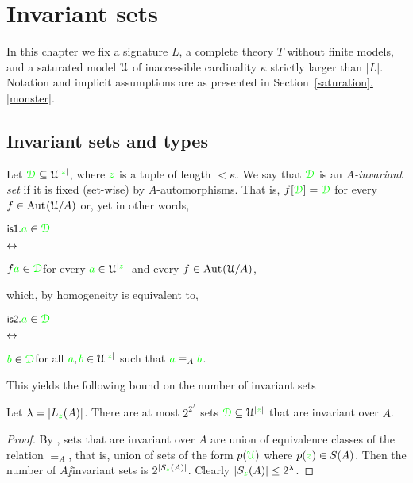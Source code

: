 \documentclass[creche.tex]{subfiles}
\begin{document}
\chapter{Invariant sets}
\label{invariant}


\def\medrel#1{\parbox[t]{6ex}{$\displaystyle\hfil #1$}}
\def\ceq#1#2#3{\parbox[t]{18ex}{$\displaystyle #1$}\medrel{#2}{$\displaystyle #3$}}

\def\mr{\color{brown}}
\def\gr{\color{green}}

In this chapter we fix a signature $L$, a complete theory $T$ without finite models, and a saturated model $\EuScript U$ of inaccessible cardinality $\kappa$ strictly larger than $|L|$. Notation and implicit assumptions are as presented in Section~\hyperref[monster]{\ref*{saturation}.\ref*{monster}}.

\section{Invariant sets and types}\label{invariant_sets}

Let $\grD\subseteq\U^{|{\gr z}|}$, where ${\gr z}$ is a tuple of length $<\kappa$. We say that $\grD$ is an \emph{$A$-invariant set} if it is fixed (set-wise) by $A$-automorphisms. That is, $f[\grD]=\grD$ for every $f\in\textrm{Aut\kern.15ex}(\EuScript U/A)$ or, yet in other words,

\ceq{\ssf{is1.}\hfill {\gr a}\in\grD}{\iff}{f{\gr a}\in\grD}\hfill for every ${\gr a}\in\U^{|{\gr z}|}$ and every $f\in\textrm{Aut\kern.15ex}(\EuScript U/A)$,

which, by homogeneity is equivalent to,

\ceq{\ssf{is2.}\hfill {\gr a}\in\grD}{\iff}{{\gr b}\in\grD}\hfill for all ${\gr a},{\gr b}\in\U^{|{\gr z}|}$ such that ${\gr a}\equiv_A{\gr b}$.

This yields the following bound on the number of invariant sets

\begin{proposition}\label{prop_numberIS}
Let $\lambda=|L_{\gr z}(A)|$. There are at most $2^{2^{\lambda}}$ sets $\grD\subseteq\U^{|{\gr z}|}$ that are invariant over $A$.
\end{proposition}
\begin{proof}
By , sets that are invariant over $A$ are union of equivalence classes of the relation $\equiv_A$, that is, union of sets of the form $p({\gr\U})$ where $p({\gr z})\in S(A)$. Then the number of $A\jj$invariant sets is $2^{|S_{\gr z}(A)|}$. Clearly $|S_{\gr z}(A)|\le 2^\lambda$.
\end{proof} 
\end{document}
